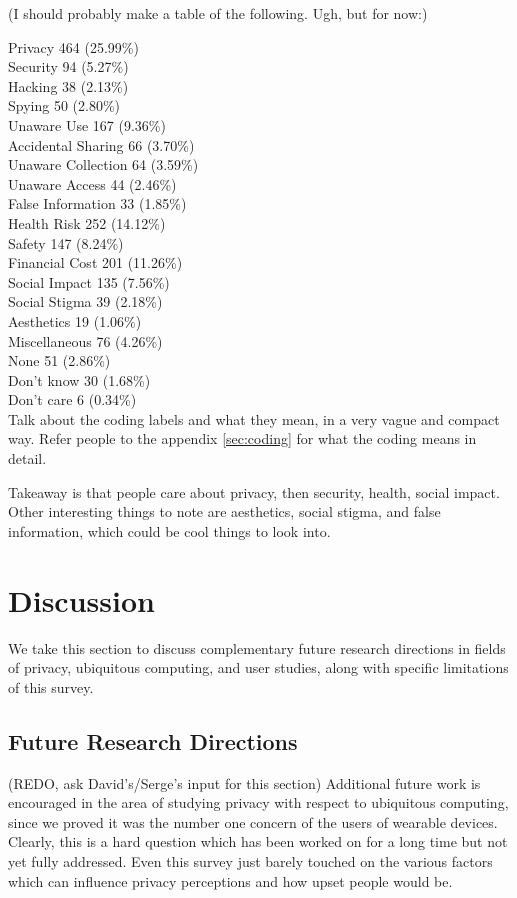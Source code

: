 \documentclass{acm_proc_article-sp}
\begin{document}
(I should probably make a table of the following. Ugh, but for now:)

Privacy 				464 (25.99\%) \\
Security 				94 (5.27\%)\\
Hacking 				38 (2.13\%)\\
Spying 				50 (2.80\%)\\ [-.5cm]

Unaware Use 			167 (9.36\%)\\
Accidental Sharing 		66 (3.70\%)\\
Unaware Collection		64 (3.59\%)\\
Unaware Access	 	44 (2.46\%)\\
False Information 		33 (1.85\%)\\[-.5cm]

Health Risk 			252 (14.12\%)\\
Safety 				147 (8.24\%)\\
Financial Cost	 		201 (11.26\%)\\[-.5cm]

Social Impact 			135 (7.56\%)\\
Social Stigma 			39 (2.18\%)\\
Aesthetics 			19 (1.06\%)\\[-.5cm]

Miscellaneous 		76 (4.26\%)\\
None				51 (2.86\%)\\
Don't know			 30 (1.68\%)\\
Don't care 			6 (0.34\%)\\

Talk about the coding labels and what they mean, in a very vague and compact way. Refer people to the appendix \ref{sec:coding} for what the coding means in detail. 

Takeaway is that people care about privacy, then security, health, social impact. Other interesting things to note are aesthetics, social stigma, and false information, which could be cool things to look into. 


\section{Discussion}
We take this section to discuss complementary future research directions in fields of privacy, ubiquitous computing, and user studies, along with specific limitations of this survey. 

\subsection{Future Research Directions}
(REDO, ask David's/Serge's input for this section) Additional future work is encouraged in the area of studying privacy with respect to ubiquitous computing, since we proved it was the number one concern of the users of wearable devices. Clearly, this is a hard question which has been worked on for a long time but not yet fully addressed. Even this survey just barely touched on the various factors which can influence privacy perceptions and how upset people would be. 
\end{document}
